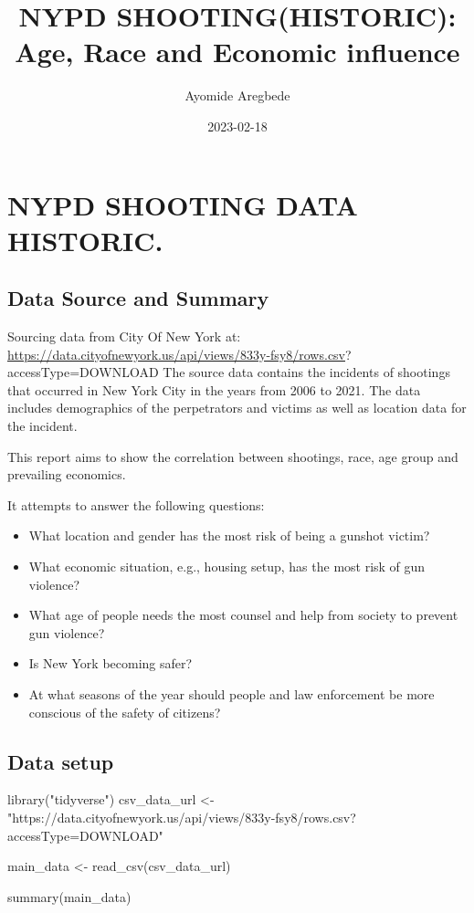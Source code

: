 \documentclass[
]{article}
\title{NYPD SHOOTING(HISTORIC): Age, Race and Economic influence}
\author{Ayomide Aregbede}
\date{2023-02-18}
\newenvironment{Shaded}{\begin{snugshade}}{\end{snugshade}}
\newcommand{\FunctionTok}[1]{\textcolor[rgb]{0.00,0.00,0.00}{#1}}
\newcommand{\NormalTok}[1]{#1}
\newcommand{\OtherTok}[1]{\textcolor[rgb]{0.56,0.35,0.01}{#1}}
\newcommand{\StringTok}[1]{\textcolor[rgb]{0.31,0.60,0.02}{#1}}
\providecommand{\tightlist}{%
  \setlength{\itemsep}{0pt}\setlength{\parskip}{0pt}}
\begin{document}
\maketitle

\hypertarget{nypd-shooting-data-historic.}{%
\section{NYPD SHOOTING DATA
HISTORIC.}\label{nypd-shooting-data-historic.}}

\hypertarget{data-source-and-summary}{%
\subsection{Data Source and Summary}\label{data-source-and-summary}}

Sourcing data from City Of New York at:
\url{https://data.cityofnewyork.us/api/views/833y-fsy8/rows.csv}?
accessType=DOWNLOAD The source data contains the incidents of shootings
that occurred in New York City in the years from 2006 to 2021. The data
includes demographics of the perpetrators and victims as well as
location data for the incident.

This report aims to show the correlation between shootings, race, age
group and prevailing economics.

It attempts to answer the following questions:

\begin{itemize}
\tightlist
\item
  What location and gender has the most risk of being a gunshot victim?
\item
  What economic situation, e.g., housing setup, has the most risk of gun
  violence?
\item
  What age of people needs the most counsel and help from society to
  prevent gun violence?
\item
  Is New York becoming safer?
\item
  At what seasons of the year should people and law enforcement be more
  conscious of the safety of citizens?
\end{itemize}

\hypertarget{data-setup}{%
\subsection{Data setup}\label{data-setup}}

\begin{Shaded}
\begin{Highlighting}[]
\FunctionTok{library}\NormalTok{(}\StringTok{"tidyverse"}\NormalTok{)}
\NormalTok{csv\_data\_url }\OtherTok{\textless{}{-}} \StringTok{"https://data.cityofnewyork.us/api/views/833y{-}fsy8/rows.csv?accessType=DOWNLOAD"}

\NormalTok{main\_data }\OtherTok{\textless{}{-}} \FunctionTok{read\_csv}\NormalTok{(csv\_data\_url)}

\FunctionTok{summary}\NormalTok{(main\_data)}
\end{Highlighting}
\end{Shaded}
\end{document}
